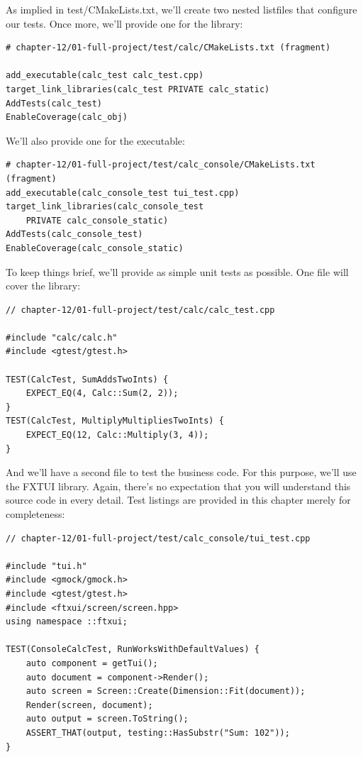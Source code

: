 As implied in test/CMakeLists.txt, we'll create two nested listfiles that configure our tests. Once more, we'll provide one for the library:

\begin{lstlisting}[style=styleCMake]
# chapter-12/01-full-project/test/calc/CMakeLists.txt (fragment)

add_executable(calc_test calc_test.cpp)
target_link_libraries(calc_test PRIVATE calc_static)
AddTests(calc_test)
EnableCoverage(calc_obj)
\end{lstlisting}

We'll also provide one for the executable:

\begin{lstlisting}[style=styleCMake]
# chapter-12/01-full-project/test/calc_console/CMakeLists.txt (fragment)
add_executable(calc_console_test tui_test.cpp)
target_link_libraries(calc_console_test
	PRIVATE calc_console_static)
AddTests(calc_console_test)
EnableCoverage(calc_console_static)
\end{lstlisting}

To keep things brief, we'll provide as simple unit tests as possible. One file will cover the library:

\begin{lstlisting}[style=styleCXX]
// chapter-12/01-full-project/test/calc/calc_test.cpp

#include "calc/calc.h"
#include <gtest/gtest.h>

TEST(CalcTest, SumAddsTwoInts) {
	EXPECT_EQ(4, Calc::Sum(2, 2));
}
TEST(CalcTest, MultiplyMultipliesTwoInts) {
	EXPECT_EQ(12, Calc::Multiply(3, 4));
}
\end{lstlisting}

And we'll have a second file to test the business code. For this purpose, we'll use the FXTUI library. Again, there's no expectation that you will understand this source code in every detail. Test listings are provided in this chapter merely for completeness:

\begin{lstlisting}[style=styleCXX]
// chapter-12/01-full-project/test/calc_console/tui_test.cpp

#include "tui.h"
#include <gmock/gmock.h>
#include <gtest/gtest.h>
#include <ftxui/screen/screen.hpp>
using namespace ::ftxui;

TEST(ConsoleCalcTest, RunWorksWithDefaultValues) {
	auto component = getTui();
	auto document = component->Render();
	auto screen = Screen::Create(Dimension::Fit(document));
	Render(screen, document);
	auto output = screen.ToString();
	ASSERT_THAT(output, testing::HasSubstr("Sum: 102"));
}
\end{lstlisting}

